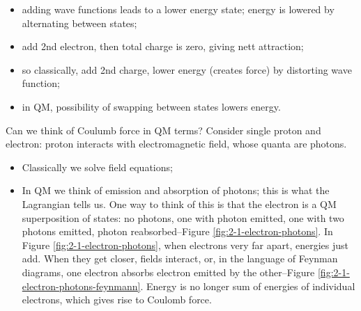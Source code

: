 \documentclass[]{article}
\begin{document}
\begin{itemize}
	\item adding wave functions leads to a lower energy state; energy is lowered by alternating between states;
	
	\item add 2nd electron, then total charge is zero, giving nett attraction; 

	\item so classically, add 2nd charge, lower energy (creates force) by distorting wave function;
	\item in QM, possibility of swapping between states lowers energy.
\end{itemize}
Can we think of Coulumb force in QM terms? Consider single proton and electron: proton interacts with electromagnetic field, whose quanta are photons.

\begin{itemize}
	\item Classically we solve field equations;
	\item In QM we think of emission and absorption of photons; this is what the Lagrangian tells us. One way to think of this is that the electron is a QM superposition of states: no photons, one with photon emitted,  one with two photons emitted, photon reabsorbed--Figure \ref{fig:2-1-electron-photons}. In Figure \ref{fig:2-1-electron-photons}, when electrons very far apart, energies just add. When they get closer, fields interact, or, in the language of Feynman diagrams, one electron absorbs electron emitted by the other--Figure \ref{fig:2-1-electron-photons-feynmann}.  Energy is no longer sum of energies of individual electrons, which gives rise to Coulomb force.
\end{itemize}
\end{document}
